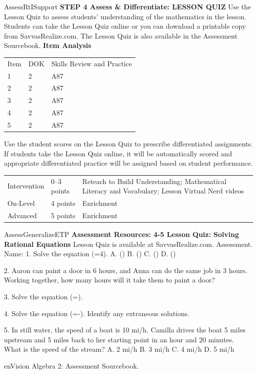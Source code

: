 \documentclass{article}
\newenvironment{te-addendum}[2]{}{}     %
\newcommand{\answer}[1]{}               %
\begin{document}
\begin{te-addendum}{Assess}{RtISupport}
\textbf{STEP 4 Assess \& Differentiate: LESSON QUIZ}
Use the Lesson Quiz to assess students' understanding of the mathematics in the lesson.
Students can take the Lesson Quiz online or you can download a printable copy from SavvasRealize.com. The Lesson Quiz is also available in the Assessment Sourcebook.
\textbf{Item Analysis}
\begin{tabular}{lll}
Item & DOK & Skills Review and Practice \\
1 & 2 & A87 \\
2 & 2 & A87 \\
3 & 2 & A87 \\
4 & 2 & A87 \\
5 & 2 & A87 \\
\end{tabular}
Use the student scores on the Lesson Quiz to prescribe differentiated assignments.
If students take the Lesson Quiz online, it will be automatically scored and appropriate differentiated practice will be assigned based on student performance.
\begin{tabular}{lll}
Intervention & 0--3 points & Reteach to Build Understanding; Mathematical Literacy and Vocabulary; Lesson Virtual Nerd videos \\
On-Level & 4 points & Enrichment \\
Advanced & 5 points & Enrichment \\
\end{tabular}
\end{te-addendum}
\begin{te-addendum}{Assess}{GeneralizeETP}
\textbf{Assessment Resources: 4-5 Lesson Quiz: Solving Rational Equations}
Lesson Quiz is available at SavvasRealize.com. Assessment.
Name: \underline{\hspace{3cm}}
1. Solve the equation (=4).
A. ()
B. ()
C. ()
D. ()
\answer{D}
2. Aaron can paint a door in 6 hours, and Anna can do the same job in 3 hours. Working together, how many hours will it take them to paint a door?
\answer{(h=2)}
3. Solve the equation (=).
\answer{(x=-6.5)}
4. Solve the equation (=-). Identify any extraneous solutions.
\answer{solution: (x=5); extraneous solution: (x=-3)}
5. In still water, the speed of a boat is 10 mi/h. Camilla drives the boat 5 miles upstream and 5 miles back to her starting point in an hour and 20 minutes. What is the speed of the stream?
A. 2 mi/h
B. 3 mi/h
C. 4 mi/h
D. 5 mi/h
\answer{D}
enVision Algebra 2: Assessment Sourcebook.
\end{te-addendum}
\end{document}
